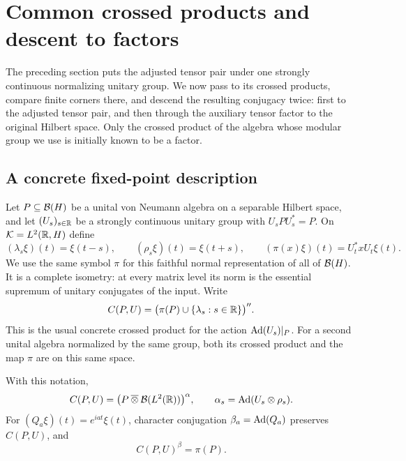 \section{Common crossed products and descent to factors}
\label{sec:cores}

The preceding section puts the adjusted tensor pair under one strongly
continuous normalizing unitary group. We now pass to its crossed products,
compare finite corners there, and descend the resulting conjugacy twice:
first to the adjusted tensor pair, and then through the auxiliary tensor
factor to the original Hilbert space. Only the crossed product of the algebra
whose modular group we use is initially known to be a factor.

\subsection{A concrete fixed-point description}

Let $P\subseteq\mathcal B(H)$ be a unital von Neumann algebra on a separable
Hilbert space, and let $(U_s)_{s\in\mathbb R}$ be a strongly continuous unitary
group with $U_sPU_s^*=P$.  On $\mathcal K=L^2(\mathbb R,H)$ define
\[
 (\lambda_s\xi)(t)=\xi(t-s),\qquad
 (\rho_s\xi)(t)=\xi(t+s),\qquad
 (\pi(x)\xi)(t)=U_t^*xU_t\xi(t).
\]
We use the same symbol $\pi$ for this faithful normal representation of
all of $\mathcal B(H)$.  It is a complete isometry: at every matrix level its
norm is the essential supremum of unitary conjugates of the input.
Write
\[
 C(P,U)=\bigl(\pi(P)\cup\{\lambda_s:s\in\mathbb R\}\bigr)''.
\]
This is the usual concrete crossed product for the action
$\operatorname{Ad}(U_s)|_P$.  For a second unital algebra normalized by the same
group, both its crossed product and the map $\pi$ are on this same
space.

\begin{lemma}
\label{lem:core-fixed-points}
With this notation,
\begin{equation}\label{eq:core-fixed-description}
 C(P,U)=
 \bigl(P\mathbin{\overline\otimes}\mathcal B(L^2(\mathbb R))\bigr)^\alpha,
 \qquad
 \alpha_s=\operatorname{Ad}(U_s\otimes\rho_s).
\end{equation}
For $(Q_a\xi)(t)=e^{iat}\xi(t)$, character conjugation
$\beta_a=\operatorname{Ad}(Q_a)$ preserves $C(P,U)$, and
\begin{equation}\label{eq:core-character-fixed}
 C(P,U)^\beta=\pi(P).
\end{equation}
\end{lemma}

